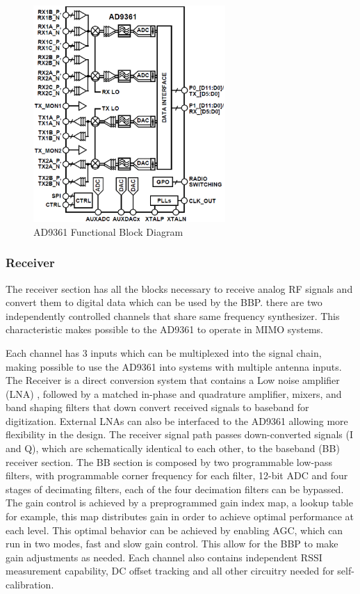 \begin{figure}[htbp]
    \centering
    \includegraphics[width=0.65\textwidth]{./figures/ad9361_functional_diagram}
    \caption{ AD9361 Functional Block Diagram
    \label{fig:ad9361func}}
\end{figure}

\subsubsection{Receiver}

The receiver section has all the blocks necessary to receive analog RF signals
and convert them to digital data which can be used by the BBP. there are two
independently controlled channels that share same frequency synthesizer. This
characteristic makes possible to the AD9361 to operate in MIMO systems.

Each channel has 3 inputs which can be multiplexed into the signal chain, making
possible to use the AD9361 into systems with multiple antenna inputs. The
Receiver is a direct conversion system that contains a Low noise amplifier (LNA) ,
followed by a matched in-phase and quadrature amplifier, mixers, and band
shaping filters that down convert received signals to baseband for digitization.
External LNAs can also be interfaced to the AD9361 allowing more flexibility in
the design. The receiver signal path passes down-converted signals (I and Q),
which are schematically identical to each other,  to the baseband (BB) receiver
section. The BB section is composed by two programmable low-pass filters, with
programmable corner frequency for each filter, 12-bit ADC and four stages of
decimating filters, each of the four decimation filters can be bypassed. The
gain control is achieved by a preprogrammed gain index map, a lookup table for
example, this map distributes gain in order to achieve optimal performance at
each level. This optimal behavior can be achieved by enabling AGC, which can run
in two modes, fast and slow gain control. This allow for the BBP to make gain
adjustments as needed. Each channel also contains independent RSSI measurement
capability, DC offset tracking and all other circuitry needed for
self-calibration.

